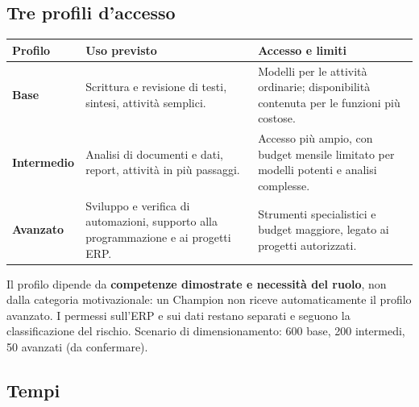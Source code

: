 \documentclass[11pt,a4paper]{article}
\begin{document}
\subsection{Tre profili d'accesso}\label{sec:10.3}

{\small\renewcommand{\arraystretch}{1.25}
\begin{xltabular}{\linewidth}{@{}>{\raggedright\arraybackslash{}\hsize\hspace{0pt}}X>{\raggedright\arraybackslash{}\hsize\hspace{0pt}}X>{\raggedright\arraybackslash{}\hsize\hspace{0pt}}X@{}}
\toprule
\textbf{Profilo} & \textbf{Uso previsto} & \textbf{Accesso e limiti} \\
\midrule
\endhead
\textbf{Base} & Scrittura e revisione di testi, sintesi, attività semplici. & Modelli per le attività ordinarie; disponibilità contenuta per le funzioni più costose. \\
\textbf{Intermedio} & Analisi di documenti e dati, report, attività in più passaggi. & Accesso più ampio, con budget mensile limitato per modelli potenti e analisi complesse. \\
\textbf{Avanzato} & Sviluppo e verifica di automazioni, supporto alla programmazione e ai progetti ERP. & Strumenti specialistici e budget maggiore, legato ai progetti autorizzati. \\
\bottomrule
\end{xltabular}}

Il profilo dipende da \textbf{competenze dimostrate e necessità del ruolo}, non dalla categoria motivazionale: un Champion non riceve automaticamente il profilo avanzato. I permessi sull'ERP e sui dati restano separati e seguono la classificazione del rischio. Scenario di dimensionamento: 600 base, 200 intermedi, 50 avanzati (da confermare).

\subsection{Tempi}\label{sec:10.4}
\end{document}
